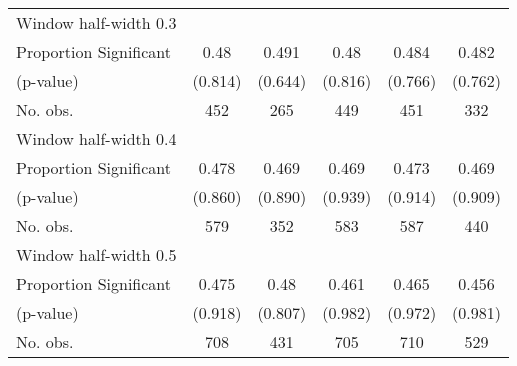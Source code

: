 \begin{tabular}{l*{5}{c}}
\hline
Window half-width 0.3\\

Proportion Significant& 0.48 &  0.491 &  0.48 &  0.484 &  0.482\\

(p-value) & (0.814) &  (0.644) &  (0.816) &  (0.766) &  (0.762)\\

No. obs.& 452 &  265 &  449 &  451 &  332\\

\hline
Window half-width 0.4\\

Proportion Significant& 0.478 &  0.469 &  0.469 &  0.473 &  0.469\\

(p-value) & (0.860) &  (0.890) &  (0.939) &  (0.914) &  (0.909)\\

No. obs.& 579 &  352 &  583 &  587 &  440\\

\hline
Window half-width 0.5\\

Proportion Significant& 0.475 &  0.48 &  0.461 &  0.465 &  0.456\\

(p-value) & (0.918) &  (0.807) &  (0.982) &  (0.972) &  (0.981)\\

No. obs.& 708 &  431 &  705 &  710 &  529\\

\hline\hline
\end{tabular}


